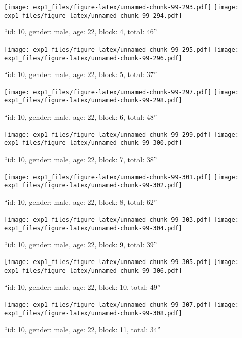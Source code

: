 \documentclass[,]{article}
\begin{document}
\texttt{[image: exp1\_files/figure-latex/unnamed-chunk-99-293.pdf]}
\texttt{[image: exp1\_files/figure-latex/unnamed-chunk-99-294.pdf]}

\newpage
[1] 

``id: 10, gender: male, age: 22, block: 4, total: 46''

\texttt{[image: exp1\_files/figure-latex/unnamed-chunk-99-295.pdf]}
\texttt{[image: exp1\_files/figure-latex/unnamed-chunk-99-296.pdf]}

\newpage
[1] 

``id: 10, gender: male, age: 22, block: 5, total: 37''

\texttt{[image: exp1\_files/figure-latex/unnamed-chunk-99-297.pdf]}
\texttt{[image: exp1\_files/figure-latex/unnamed-chunk-99-298.pdf]}

\newpage
[1] 

``id: 10, gender: male, age: 22, block: 6, total: 48''

\texttt{[image: exp1\_files/figure-latex/unnamed-chunk-99-299.pdf]}
\texttt{[image: exp1\_files/figure-latex/unnamed-chunk-99-300.pdf]}

\newpage
[1] 

``id: 10, gender: male, age: 22, block: 7, total: 38''

\texttt{[image: exp1\_files/figure-latex/unnamed-chunk-99-301.pdf]}
\texttt{[image: exp1\_files/figure-latex/unnamed-chunk-99-302.pdf]}

\newpage
[1] 

``id: 10, gender: male, age: 22, block: 8, total: 62''

\texttt{[image: exp1\_files/figure-latex/unnamed-chunk-99-303.pdf]}
\texttt{[image: exp1\_files/figure-latex/unnamed-chunk-99-304.pdf]}

\newpage
[1] 

``id: 10, gender: male, age: 22, block: 9, total: 39''

\texttt{[image: exp1\_files/figure-latex/unnamed-chunk-99-305.pdf]}
\texttt{[image: exp1\_files/figure-latex/unnamed-chunk-99-306.pdf]}

\newpage
[1] 

``id: 10, gender: male, age: 22, block: 10, total: 49''

\texttt{[image: exp1\_files/figure-latex/unnamed-chunk-99-307.pdf]}
\texttt{[image: exp1\_files/figure-latex/unnamed-chunk-99-308.pdf]}

\newpage
[1] 

``id: 10, gender: male, age: 22, block: 11, total: 34''
\end{document}
